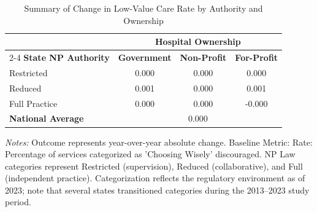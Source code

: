 \begin{table}[htbp]
    \centering
    \caption{Summary of Change in Low-Value Care Rate by Authority and Ownership}
    \label{tab:d_partb_low_value_rate}
    \vspace{0.2cm}
    \begin{tabular}{lccc}
        \toprule
        & \multicolumn{3}{c}{\textbf{Hospital Ownership}} \\
        \cmidrule(lr){2-4}
        \textbf{State NP Authority} & \textbf{Government} & \textbf{Non-Profit} & \textbf{For-Profit} \\
        \midrule
        Restricted & 0.000 & 0.000 & 0.000 \\
        Reduced & 0.001 & 0.000 & 0.001 \\
        Full Practice & 0.000 & 0.000 & -0.000 \\
        \midrule
        \textbf{National Average} & \multicolumn{3}{c}{0.000} \\
        \bottomrule
    \end{tabular}
    \vspace{0.1cm}
    \begin{minipage}{0.85\textwidth}
        \footnotesize \textit{Notes:} Outcome represents year-over-year absolute change. Baseline Metric: Rate: Percentage of services categorized as 'Choosing Wisely' discouraged. NP Law categories represent Restricted (supervision), Reduced (collaborative), and Full (independent practice). Categorization reflects the regulatory environment as of 2023; note that several states transitioned categories during the 2013--2023 study period.
    \end{minipage}
\end{table}